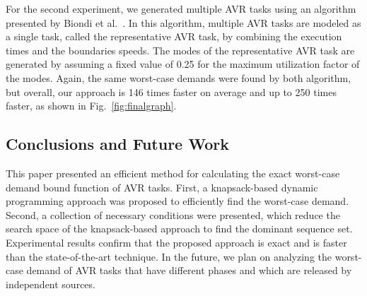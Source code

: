 For the second experiment, we generated multiple AVR tasks using an algorithm presented by Biondi et al.~\cite{biondi_response-time_2015}. In this algorithm, multiple AVR tasks are modeled as a single task, called the representative AVR task, by combining the execution times and the boundaries speeds. The modes of the representative AVR task are generated by assuming a fixed value of 0.25 for the maximum utilization factor of the modes. Again, the same worst-case demands were found by both algorithm, but overall, our approach is 146 times faster on average and up to 250 times faster, as shown in Fig.~\ref{fig:finalgraph}.


\subsection{Conclusions and Future Work}
\label{sec:conclusion}

This paper presented an efficient method for calculating the exact worst-case demand bound function of AVR tasks. First, a knapsack-based dynamic programming approach was proposed to efficiently find the worst-case demand. Second, a collection of necessary conditions were presented, which reduce the search space of the knapsack-based approach to find the dominant sequence set. Experimental results confirm that the proposed approach is exact and is faster than the state-of-the-art technique. In the future, we plan on analyzing the worst-case demand of AVR tasks that have different phases and which are released by independent sources.

